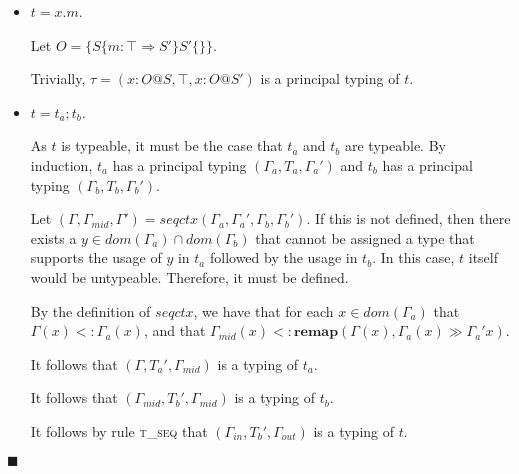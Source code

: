 \documentclass[preprint]{sigplanconf}
\newcommand{\lemref}[1]{Lemma \ref{#1}}
\newcommand{\tlet}{\textsc{t\_let} }
\newcommand{\tseq}{\textsc{t\_seq} }
\newcommand{\remapapp}[3]{\ensuremath{\mathbf{remap}(#1, #2 \gg #3)}}
\newcommand{\qed}{$\blacksquare$}
\newenvironment{proof}{\vspace{1ex}\noindent{\bf Proof}\hspace{0.5em}}
  {\hfill\qed\vspace{1ex}}
\begin{document}
\begin{proof}
\begin{itemize}
If $x \in \Gamma_b$, let $T_x = \Gamma_b(x)$ and $T_x' = \Gamma_b'(x)$.
If $x \notin \Gamma_b$ (i.e. $x$ is not used in the body of the let binding), 
let $T_x = T_x' = \top$. Either directly or by \lemref{lem:weakening},
$((\Gamma_b'', x : T_x), T_b, (\Gamma_b''', x : T_x'))$ is a typing of $t'$.

In order for $t$ to be typeable, it must be the case that $T_v' <: T_x$.
Let $\Gamma_{mid}' = \Gamma_{mid}, x : T_v'$.
By \lemref{lem:upgrade}, there exists a $T_b' <: T_b$ and $T_x'' <: remap(T_v', T_x \gg T_x')$ such that
$(\Gamma_{mid}', T_b', (\Gamma_{out}, x : T_x''))$ is a typing of $t_b$.

By rule \tlet it follows that $(\Gamma_{in}, T_b', \Gamma_{out})$ is a
typing of $t$. This typing must be principal.



\item $t = x.m$.

Let $O = \{ S \{ m : \top \Rightarrow S' \} S' \{ \} \}$.

Trivially, $\tau = (x : O@S, \top,  x : O@S')$
is a principal typing of $t$.

\item $t = t_a; t_b$.

As $t$ is typeable, it must be the case that $t_a$ and $t_b$ are typeable.
By induction, $t_a$ has a principal typing $(\Gamma_a, T_a, \Gamma_a')$ and
$t_b$ has a principal typing $(\Gamma_b, T_b, \Gamma_b')$.

Let $(\Gamma, \Gamma_{mid}, \Gamma') = \mathit{seqctx}(\Gamma_a, \Gamma_a', \Gamma_b, \Gamma_b')$.
If this is not defined, then there exists a $y \in dom(\Gamma_a) \cap dom(\Gamma_b)$
that cannot be assigned a type that supports the usage of $y$ in $t_a$
followed by the usage in $t_b$. 
In this case, $t$ itself would be untypeable. Therefore, it must be defined.

By the definition of $\mathit{seqctx}$, we have that for each
$x \in dom(\Gamma_a)$ that $\Gamma(x) <: \Gamma_a(x)$, and
that $\Gamma_{mid}(x) <: \remapapp{\Gamma(x)}{\Gamma_a(x)}{\Gamma_a'{x}}$.

It follows that $(\Gamma, T_a', \Gamma_{mid})$ is a typing of
$t_a$.


It follows that $(\Gamma_{mid}, T_b', \Gamma_{mid})$ is a typing of
$t_b$.


It follows by rule \tseq that $(\Gamma_{in}, T_b', \Gamma_{out})$ is a typing
of $t$.


\end{itemize}
\end{proof}
\end{document}
